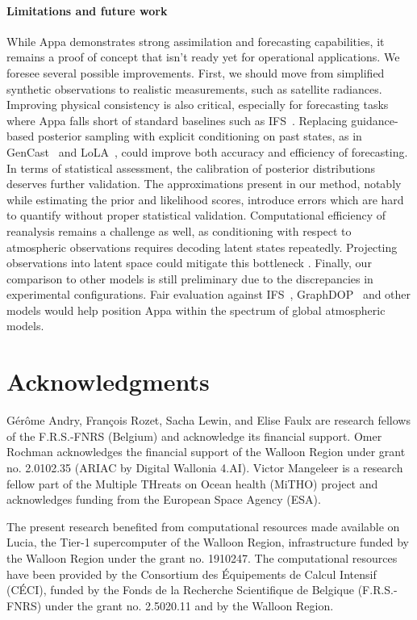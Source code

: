 \paragraph{Limitations and future work}
While Appa demonstrates strong assimilation and forecasting capabilities, it remains a proof of concept that isn't ready yet for operational applications. We foresee several possible improvements. First, we should move from simplified synthetic observations to realistic measurements, such as satellite radiances. Improving physical consistency is also critical, especially for forecasting tasks where Appa falls short of standard baselines such as IFS~\cite{ecmwf2020ifs}. Replacing guidance-based posterior sampling with explicit conditioning on past states, as in GenCast~\cite{price2025probabilistic} and LoLA~\cite{rozet2024learning}, could improve both accuracy and efficiency of forecasting. In terms of statistical assessment, the calibration of posterior distributions deserves further validation. The approximations present in our method, notably while estimating the prior and likelihood scores, introduce errors which are hard to quantify without proper statistical validation. Computational efficiency of reanalysis remains a challenge as well, as conditioning with respect to atmospheric observations requires decoding latent states repeatedly. Projecting observations into latent space could mitigate this bottleneck \cite{raphaeli2025silo}. Finally, our comparison to other models is still preliminary due to the discrepancies in experimental configurations. Fair evaluation against IFS~\cite{ecmwf2020ifs}, GraphDOP~\cite{alexe2024graphdop} and other models \cite{lam2023learning, price2025probabilistic} would help position Appa within the spectrum of global atmospheric models.

\section*{Acknowledgments}

Gérôme Andry, François Rozet, Sacha Lewin, and Elise Faulx are research fellows of the F.R.S.-FNRS (Belgium) and acknowledge its financial support. Omer Rochman acknowledges the financial support of the Walloon Region under grant no. 2.0102.35 (ARIAC by Digital Wallonia 4.AI). Victor Mangeleer is a research fellow part of the Multiple THreats on Ocean health (MiTHO) project and acknowledges funding from the European Space Agency (ESA).

The present research benefited from computational resources made available on Lucia, the Tier-1 supercomputer of the Walloon Region, infrastructure funded by the Walloon Region under the grant no. 1910247. The computational resources have been provided by the Consortium des Équipements de Calcul Intensif (CÉCI), funded by the Fonds de la Recherche Scientifique de Belgique (F.R.S.-FNRS) under the grant no. 2.5020.11 and by the Walloon Region.

